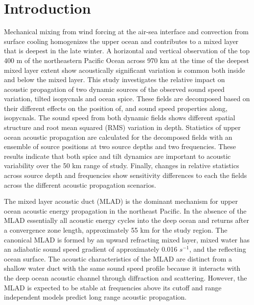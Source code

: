 \documentclass[preprint,NumberedRefs]{JASA}
\begin{document}
\section{\label{sec:intro} Introduction}
Mechanical mixing from wind forcing at the air-sea interface and convection from surface cooling homogenizes the upper ocean and contributes to a mixed layer that is deepest in the late winter.\citep{cole2010seasonal} A horizontal and vertical observation of the top 400 m of the northeastern Pacific Ocean across 970 km at the time of the deepest mixed layer extent show acoustically significant variation is common both inside and below the mixed layer.\citep{colosi2020observations} This study investigates the relative impact on acoustic propagation of two dynamic sources of the observed sound speed variation, tilted isopycnals and ocean spice. These fields are decomposed based on their different effects on the position of, and sound speed properties along, isopycnals.\cite{dzieciuch2004} The sound speed from both dynamic fields shows different spatial structure and root mean squared (RMS) variation in depth. Statistics of upper ocean acoustic propagation are calculated for the decomposed fields with an ensemble of source positions at two source depths and two frequencies. These results indicate that both spice and tilt dynamics are important to acoustic variability over the 50 km range of study. Finally, changes in relative statistics across source depth and frequencies show sensitivity differences to each the fields across the different acoustic propagation scenarios.

The mixed layer acoustic duct (MLAD) is the dominant mechanism for upper ocean acoustic energy propagation in the northeast Pacific. In the absence of the MLAD essentially all acoustic energy cycles into the deep ocean and returns after a convergence zone length,\cite{jensen2011computational} approximately 55 km for the study region. The canonical MLAD is formed by an upward refracting mixed layer, mixed water has an adiabatic sound speed gradient of approximately 0.016 $s^{-1}$, and the reflecting ocean surface. The acoustic characteristics of the MLAD are distinct from a shallow water duct with the same sound speed profile because it interacts with the deep ocean acoustic channel through diffraction\citep{porter93} and scattering.\cite{colosi2020observations} However, the MLAD is expected to be stable at frequencies above its cutoff\citep{Urick1982Prop} and range independent models predict long range acoustic propagation.
\end{document}
